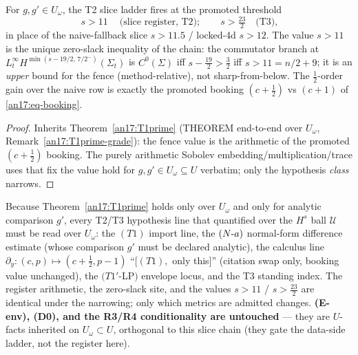 \begin{corollary}\label{an17:fence}\label{cor:an-fence}%
For $g,g'\in U_\omega$, the T2 slice ladder fires at the promoted threshold
\begin{equation}\label{an17:eq-fence}
 \boxed{\ s>11\ }\quad\text{(slice register, T2)};\qquad
 s>\tfrac{23}{2}\quad\text{(T3)},
\end{equation}
in place of the naive-fallback slice $s>11.5$ / locked-4d $s>12$. The value $s>11$
is the unique zero-slack inequality of the chain: the commutator branch at
$L^\infty_t H^{\min(s-19/2,\,7/2^-)}(\Sigma_t)$ is $C^0(\Sigma)$ iff
$s-\tfrac{19}{2}>\tfrac32$ iff $s>11=n/2+9$; it is an \emph{upper} bound for the
fence (method-relative), not sharp-from-below. The $\tfrac12$-order gain over the
naive row is exactly the promoted booking $(c+\tfrac12)$ vs $(c+1)$ of
\eqref{an17:eq-booking}.
\end{corollary}
\begin{proof}
Inherits Theorem~\ref{an17:T1prime} (THEOREM end-to-end over $U_\omega$,
Remark~\ref{an17:T1prime-grade}): the fence value is the arithmetic of the
promoted $(c+\tfrac12)$ booking. The purely arithmetic Sobolev
embedding/multiplication/trace uses that fix the value hold for $g,g'\in
U_\omega\subseteq U$ verbatim; only the hypothesis \emph{class} narrows.
\end{proof}

\begin{remark}
\label{an17:loci}
Because Theorem~\ref{an17:T1prime} holds only over $U_\omega$ and only for
analytic comparison $g'$, every T2/T3 hypothesis line that quantified over the
$H^s$ ball $\mathcal U$ must be read over $U_\omega$: the $(T1)$ import line, the
$(N\text-a)$ normal-form difference estimate (whose comparison $g'$ must be
declared analytic), the calculus line
$\partial_y:(c,p)\mapsto(c+\tfrac12,p-1)$ ``$[(T1),$ only this$]$'' (citation
swap only, booking value unchanged), the $(T1'$-LP$)$ envelope locus, and the T3
standing index. The register arithmetic, the zero-slack site, and the values
$s>11$ / $s>\tfrac{23}{2}$ are identical under the narrowing; only which metrics
are admitted changes. \textbf{(E-env), (D0), and the R3/R4 conditionality are
untouched} --- they are $U$-facts inherited on $U_\omega\subset U$, orthogonal to
this slice chain (they gate the data-side ladder, not the register here).
\end{remark}

